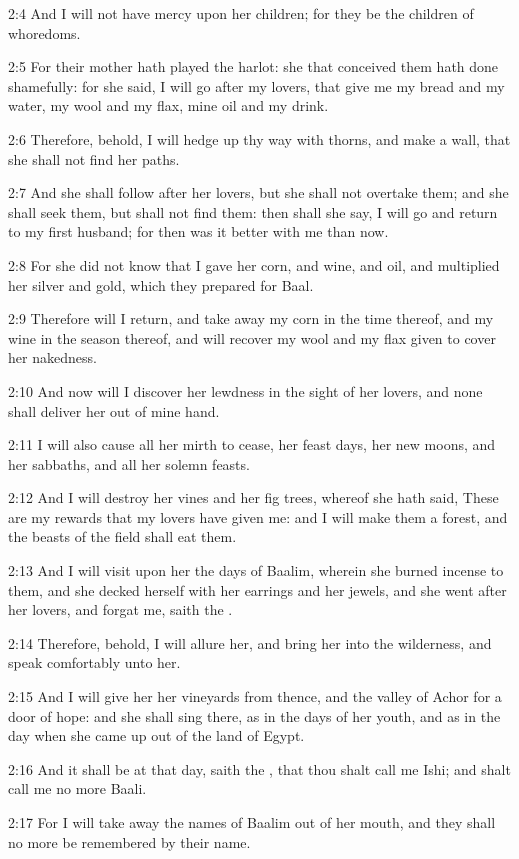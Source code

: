 2:4 And I will not have mercy upon her children; for they be the children of whoredoms.

2:5 For their mother hath played the harlot: she that conceived them hath done shamefully: for she said, I will go after my lovers, that give me my bread and my water, my wool and my flax, mine oil and my drink.

2:6 Therefore, behold, I will hedge up thy way with thorns, and make a wall, that she shall not find her paths.

2:7 And she shall follow after her lovers, but she shall not overtake them; and she shall seek them, but shall not find them: then shall she say, I will go and return to my first husband; for then was it better with me than now.

2:8 For she did not know that I gave her corn, and wine, and oil, and multiplied her silver and gold, which they prepared for Baal.

2:9 Therefore will I return, and take away my corn in the time thereof, and my wine in the season thereof, and will recover my wool and my flax given to cover her nakedness.

2:10 And now will I discover her lewdness in the sight of her lovers, and none shall deliver her out of mine hand.

2:11 I will also cause all her mirth to cease, her feast days, her new moons, and her sabbaths, and all her solemn feasts.

2:12 And I will destroy her vines and her fig trees, whereof she hath said, These are my rewards that my lovers have given me: and I will make them a forest, and the beasts of the field shall eat them.

2:13 And I will visit upon her the days of Baalim, wherein she burned incense to them, and she decked herself with her earrings and her jewels, and she went after her lovers, and forgat me, saith the \LORD.

2:14 Therefore, behold, I will allure her, and bring her into the wilderness, and speak comfortably unto her.

2:15 And I will give her her vineyards from thence, and the valley of Achor for a door of hope: and she shall sing there, as in the days of her youth, and as in the day when she came up out of the land of Egypt.

2:16 And it shall be at that day, saith the \LORD, that thou shalt call me Ishi; and shalt call me no more Baali.

2:17 For I will take away the names of Baalim out of her mouth, and they shall no more be remembered by their name.

